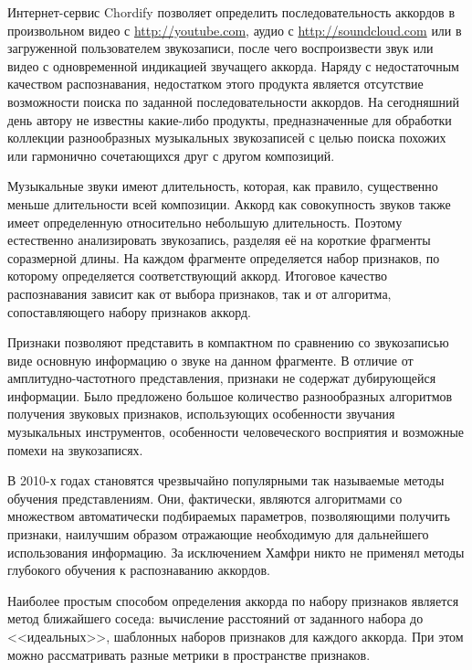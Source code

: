 Интернет-сервис Chordify \cite{Chordify} позволяет определить последовательность
аккордов в произвольном видео с \url{http://youtube.com}, аудио с
\url{http://soundcloud.com} или в загруженной пользователем звукозаписи, после
чего воспроизвести звук или видео с одновременной индикацией звучащего аккорда.
Наряду с недостаточным качеством распознавания, недостатком этого продукта
является отсутствие возможности поиска по заданной последовательности аккордов.
На сегодняшний день автору не известны какие-либо продукты, предназначенные для
обработки коллекции разнообразных музыкальных звукозаписей с целью поиска
похожих или гармонично сочетающихся друг с другом композиций.

Музыкальные звуки имеют длительность, которая, как правило, существенно меньше
длительности всей композиции. Аккорд как совокупность звуков также имеет
определенную относительно небольшую длительность. Поэтому естественно
анализировать звукозапись, разделяя её на короткие фрагменты соразмерной длины.
На каждом фрагменте определяется набор признаков, по которому определяется
соответствующий аккорд. Итоговое качество распознавания зависит как от выбора
признаков, так и от алгоритма, сопоставляющего набору признаков аккорд.

Признаки позволяют представить в компактном по сравнению со звукозаписью виде
основную информацию о звуке на данном фрагменте. В отличие от
амплитудно-частотного представления, признаки не содержат дубирующейся
информации. Было предложено большое количество разнообразных алгоритмов
получения звуковых признаков, использующих особенности звучания музыкальных
инструментов, особенности человеческого восприятия и возможные помехи на
звукозаписях.

В 2010-х годах становятся чрезвычайно популярными так называемые методы
обучения представлениям. Они, фактически, являются алгоритмами со множеством
автоматически подбираемых параметров, позволяющими получить признаки, наилучшим
образом отражающие необходимую для дальнейшего использования информацию. За
исключением Хамфри \cite{Humphrey2012} никто не применял методы глубокого
обучения к распознаванию аккордов.

Наиболее простым способом определения аккорда по набору признаков является метод
ближайшего соседа: вычисление расстояний от заданного набора до <<идеальных>>,
шаблонных наборов признаков для каждого аккорда. При этом можно рассматривать
разные метрики в пространстве признаков.

